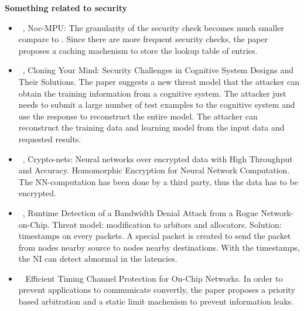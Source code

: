 \documentclass[]{article}
\begin{document}
\textbf{Something related to security}
\begin{itemize}
	\item ~\cite{porquet2011noc}, Noc-MPU: The granularity of the security check
	becomes much smaller compare to \cite{fiorin2008secure}. Since there are
	more frequent security checks, the paper proposes a caching machenism to
	store the lookup table of entries.
	\item ~\cite{liu2015cloning}, Cloning Your Mind: Security Challenges in
	Cognitive System Designs and Their Solutions. The paper suggests a new
	threat model that the attacker can obtain the training information from a
	cognitive system. The attacker just needs to submit a large number of test
	examples to the cognitive system and use the response to reconstruct the
	entire model. The attacker can reconstruct the training data and learning
	model from the input data and requested results.
	\item ~\cite{xie2014crypto}, Crypto-nets: Neural networks over encrypted
	data with High Throughput and Accuracy. Homomorphic Encryption for Neural
	Network Computation. The NN-computation has been done by a third party,
	thus the data has to be encrypted.
	\item ~\cite{js2015runtime}, Runtime Detection of a Bandwidth Denial Attack
	from a Rogue Network-on-Chip. Threat model: modification to arbitors and
	allocators.  Solution: timestamps on every packets. A special packet is created
	to send the packet from nodes nearby source to nodes nearby destinations. With
	the timestamps, the NI can detect abnormal in the latencies.
	\item ~\cite{wang2012efficient} Efficient Timing Channel Protection for
	On-Chip Networks. In order to prevent applications to communicate convertly,
	the paper proposes a priority based arbitration and a static limit machenism to
	prevent information leaks.
\end{itemize}
\end{document}
